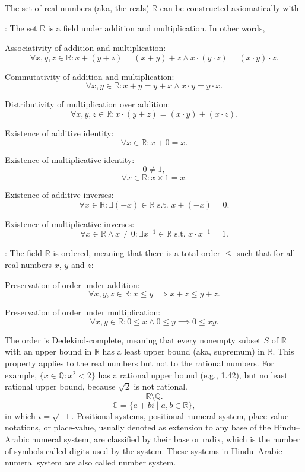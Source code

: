 \documentclass[a4paper,12pt]{report}
\begin{document}
The set of real numbers (aka, the reals) $\mathbb{R}$ can be constructed axiomatically with
\bit
\item {}: The set $\mathbb{R}$ is a field under addition and multiplication. In other words,
\bit
\item Associativity of addition and multiplication:
\[\forall x,y,z\in\mathbb{R}\colon x+(y+z)=(x+y)+z\land x\cdot(y\cdot z)=(x\cdot y)\cdot z.\]
\item Commutativity of addition and multiplication:
\[\forall x,y\in\mathbb{R}\colon x+y=y+x\land x\cdot y=y\cdot x.\]
\item Distributivity of multiplication over addition:
\[\forall x,y,z\in\mathbb{R}\colon x\cdot(y+z)=(x\cdot y)+(x\cdot z).\]
\item Existence of additive identity:
\[\forall x\in\mathbb{R}\colon x+0=x.\]
\item Existence of multiplicative identity:
\[0\neq 1,\]
\[\forall x\in\mathbb{R}\colon x\times 1=x.\]
\item Existence of additive inverses:
\[\forall x\in\mathbb{R}\colon\exists(-x)\in\mathbb{R}\text{\ s.t.\ }x+(-x)=0.\]
\item Existence of multiplicative inverses:
\[\forall x\in\mathbb{R}\land x\neq 0\colon\exists x^{-1}\in\mathbb{R}\text{\ s.t.\ }x\cdot x^{-1}=1.\]
\eit
\item {}: The field $\mathbb{R}$ is ordered, meaning that there is a total order $\leq$ such that for all real numbers $x$, $y$ and $z$:
\bit
\item Preservation of order under addition:
\[\forall x,y,z\in\mathbb{R}\colon x\leq y\implies x+z\leq y+z.\]
\item Preservation of order under multiplication:
\[\forall x,y\in\mathbb{R}\colon 0\leq x\land 0\leq y\implies 0\leq xy.\]
\item The order is Dedekind-complete, meaning that every nonempty subset $S$ of $\mathbb{R}$ with an upper bound in $\mathbb{R}$ has a least upper bound (aka, supremum) in $\mathbb{R}$. This property applies to the real numbers but not to the rational numbers. For example, $\{x\in\mathbb{Q}\colon x^2<2\}$ has a rational upper bound (e.g., 1.42), but no least rational upper bound, because $\sqrt{2}$ is not rational.
\eit\eit
{}
\[\mathbb{R}\setminus\mathbb{Q}.\]
\[\mathbb{C}=\{a+bi\mid a,b\in\mathbb{R}\},\]
in which $i=\sqrt{-1}$.
Positional systems, positional numeral system, place-value notations, or place-value, usually denoted as extension to any base of the Hindu–Arabic numeral system, are classified by their base or radix, which is the number of symbols called digits used by the system. These systems in Hindu–Arabic numeral system are also called number system.
\end{document}
